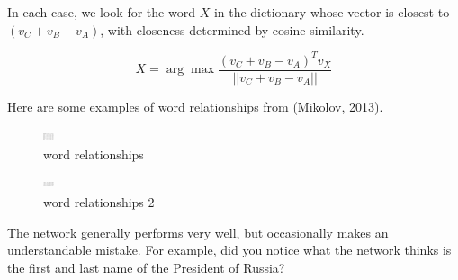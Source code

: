 \documentclass[11pt]{article}
\begin{document}
In each case, we look for the word $X$ in the dictionary whose vector is closest to $(v_C + v_B - v_A)$, with closeness determined by cosine similarity.

\[X = \arg \max \dfrac{(v_C + v_B -v_A)^T v_X}{||v_C + v_B -v_A||}\]

Here are some examples of word relationships from (Mikolov, 2013).

\begin{figure}[h]
    \centering
    \includegraphics[width=12,height=12]{../out/images/word-relationships}
    \caption[word relationships]{word relationships}
    \label{fig:word relationships}
\end{figure}

\begin{figure}[h]
    \centering
    \includegraphics[width=12,height=12]{../out/images/word-relationships-2}
    \caption[word relationships 2]{word relationships 2}
    \label{fig:word relationships 2}
\end{figure}

The network generally performs very well, but occasionally makes an
understandable mistake.
For example, did you notice what the network thinks is the first and last name
of the President of Russia?
\end{document}
